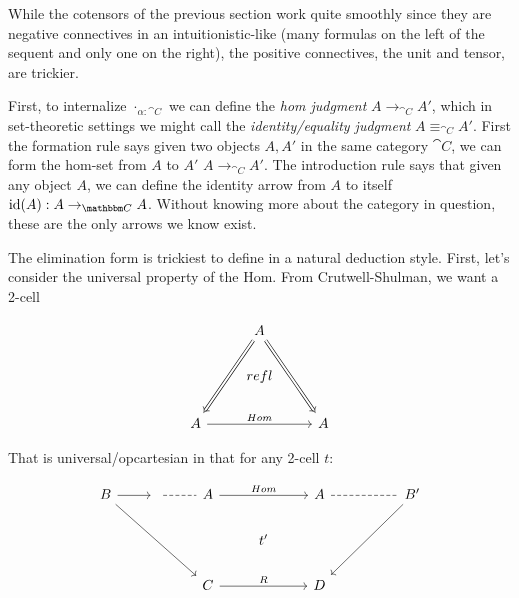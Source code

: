 \documentclass{article}
\begin{document}
While the cotensors of the previous section work quite smoothly since
they are negative connectives in an intuitionistic-like (many formulas
on the left of the sequent and only one on the right), the positive
connectives, the unit and tensor, are trickier.

First, to internalize $\cdot_{\alpha : \cat C}$ we can define the
\emph{hom judgment} $A \to_{\cat C} A'$, which in set-theoretic
settings we might call the \emph{identity/equality judgment}
$A \equiv_{\cat C} A'$.
%
First the formation rule says given two objects $A,A'$ in the same
category $\cat C$, we can form the hom-set from $A$ to $A'$ $A
\to_{\cat C} A'$.
%
The introduction rule says that given any object $A$, we can define
the identity arrow from $A$ to itself $\id(A) : A \to_{\cat C} A$.
%
Without knowing more about the category in question, these are the
only arrows we know exist.
%

The elimination form is trickiest to define in a natural deduction style.
%
First, let's consider the universal property of the Hom. From
Crutwell-Shulman, we want a 2-cell

\[%
\begin{tikzcd}
                    & A \arrow[ldd, no head, Rightarrow] \arrow[rdd, no head, Rightarrow] &   \\
                    & refl                                                                &   \\
A \arrow[rr, "Hom"] &                                                                     & A
\end{tikzcd}\]

That is universal/opcartesian in that for any 2-cell $t$:

\[ %
\begin{tikzcd}
B \arrow[r] \arrow[rrdd] & {} \arrow[r, no head, dashed] & A \arrow[rr, "Hom"] &    & A \arrow[rr, no head, dashed] &  & B' \arrow[lldd] \\
                         &                               &                     & t' &                               &  &                 \\
                         &                               & C \arrow[rr, "R"]   &    & D                             &  &                
\end{tikzcd}\]
\end{document}
